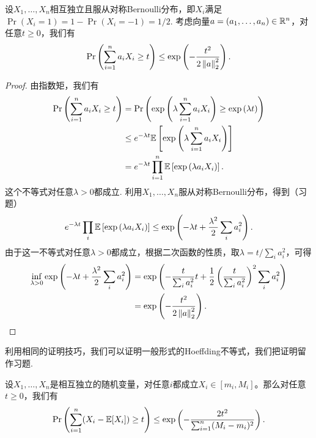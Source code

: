 \begin{theorem}\label{thm:hoeffding-inequality}
    设$X_1, \dots, X_n$相互独立且服从对称Bernoulli分布，即$X_i$满足$\Pr(X_i=1)=1-\Pr(X_i=-1)=1/2$. 考虑向量$a = (a_1, \dots, a_n) \in \mathbb{R}^n$，对任意$t\geq0$，我们有
    \[
        \Pr\left(\sum_{i=1}^n a_i X_i \geq t\right)\leq \exp \left( - \frac{t^2}{2\left\|a\right\|^2_2}\right).
    \]
\end{theorem}
\begin{proof}
由指数矩，我们有
\[
\begin{aligned}
    \Pr\left(\sum_{i=1}^n a_i X_i \geq t\right) &= \Pr\left(\exp\left(\lambda \sum_{i=1}^n a_i X_i\right) \geq \exp\left(\lambda t\right)\right) \\
    &\leq e^{-\lambda t} \mathbb{E} \left[\exp\left(\lambda \sum_{i=1}^n a_i X_i\right)\right]\\
    &=  e^{-\lambda t}\prod_{i=1}^n \mathbb{E}\left[\exp\left(\lambda a_i X_i\right)\right].
\end{aligned}
\]
这个不等式对任意$\lambda > 0$都成立. 
利用$X_1, \dots, X_n$服从对称Bernoulli分布，得到（习题）
\begin{equation}
e^{-\lambda t}\prod_{i} \mathbb{E}\left[\exp\left(\lambda a_i X_i\right)\right]\leq\exp \left(-\lambda t + \frac{\lambda^2}{2} \sum_{i} a_i^2\right).\label{eq:exponential-moment}
\end{equation}
由于这一不等式对任意$\lambda > 0$都成立，根据二次函数的性质，取$\lambda = t / \sum_i a_i^2$，可得
\[
\begin{aligned}
    \inf_{\lambda>0}\exp \left(-\lambda t + \frac{\lambda^2}{2} \sum_{i} a_i^2\right) &=\exp\left( -\frac{t}{\sum_i a_i^2} t + \frac12 \left(\frac{t}{\sum_i a_i^2}\right)^2 \sum_{i} a_i^2\right) \\
    &= \exp \left( - \frac{t^2}{2\left\|a\right\|_2^2}\right).
\end{aligned}
\]
\end{proof}

利用相同的证明技巧，我们可以证明一般形式的Hoeffding不等式，我们把证明留作习题.

\begin{theorem}\label{thm:hoeffding-inequality-general}
    设$X_1, \dots, X_n$是相互独立的随机变量，对任意$i$都成立$X_i \in [m_i, M_i]$。那么对任意$t\geq0$，我们有
    \[
        \Pr\left(\sum_{i=1}^n (X_i - \mathbb{E} [X_i]) \geq t\right) \leq \exp \left( - \frac{2t^2}{\sum_{i=1}^n (M_i - m_i)^2}\right).
    \]
\end{theorem}

